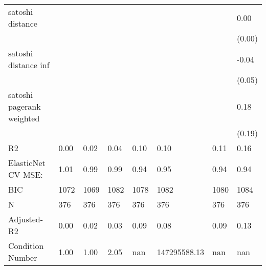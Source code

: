 \begin{table*}
\begin{center}
\begin{tabular}{llllllll}
 satoshi distance                           &          &            &         &         &              &                    & 0.00      \\
                                                 &          &            &         &         &              &                    & (0.00)    \\
 satoshi distance inf                       &          &            &         &         &              &                    & -0.04     \\
                                                 &          &            &         &         &              &                    & (0.05)    \\
 satoshi pagerank weighted                  &          &            &         &         &              &                    & 0.18      \\
                                                 &          &            &         &         &              &                    & (0.19)    \\
R2                                               & 0.00     & 0.02       & 0.04    & 0.10    & 0.10         & 0.11               & 0.16      \\
ElasticNet CV MSE:                               & 1.01     & 0.99       & 0.99    & 0.94    & 0.95         & 0.94               & 0.94      \\
BIC                                              & 1072     & 1069       & 1082    & 1078    & 1082         & 1080               & 1084      \\
N                                                & 376      & 376        & 376     & 376     & 376          & 376                & 376       \\
Adjusted-R2                                      & 0.00     & 0.02       & 0.03    & 0.09    & 0.08         & 0.09               & 0.13      \\
Condition Number                                 & 1.00     & 1.00       & 2.05    & nan     & 147295588.13 & nan                & nan       \\
\hline
\end{tabular}
\end{center}
\end{table*}
